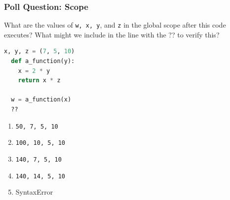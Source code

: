 \documentclass{beamer}
\begin{document}
%
%
\begin{frame}[fragile]
  \frametitle{Poll Question: Scope}
  What are the values of \lstinline|w, x, y|, and \lstinline|z| in the global scope after this code executes? What might we include in the line with the ?? to verify this?
  \begin{lstlisting}[language=Python, autogobble]
  x, y, z = (7, 5, 10)
  def a_function(y):
    x = 2 * y
    return x * z

  w = a_function(x)
  ??
  \end{lstlisting}
  \vfill
  \begin{enumerate}[A]
    \item \lstinline|50, 7, 5, 10|
    \item \lstinline|100, 10, 5, 10|
    \item \lstinline|140, 7, 5, 10|
    \item \lstinline|140, 14, 5, 10|
    \item SyntaxError
  \end{enumerate}
\end{frame}
\end{document}

